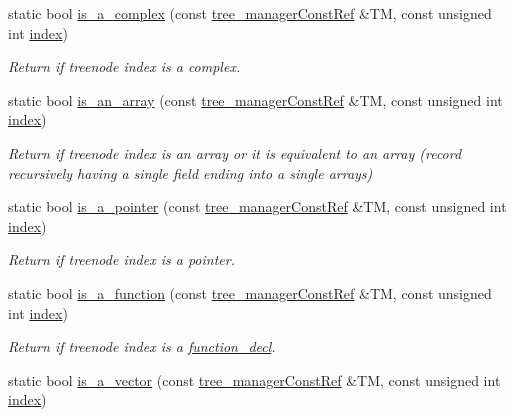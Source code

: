 \begin{DoxyCompactItemize}
static bool \hyperlink{classtree__helper_af7b886ed7c1bbaa4149b536830c5d16d}{is\+\_\+a\+\_\+complex} (const \hyperlink{tree__manager_8hpp_a792e3f1f892d7d997a8d8a4a12e39346}{tree\+\_\+manager\+Const\+Ref} \&TM, const unsigned int \hyperlink{tutorial__pact__2019_2Introduction_2third_2include_2Keccak_8h_a028c9bdc8344cca38ab522a337074797}{index})
\begin{DoxyCompactList}\small\item\em Return if treenode index is a complex. \end{DoxyCompactList}\item 
static bool \hyperlink{classtree__helper_a66c316e257537a7af62192751c0fb26a}{is\+\_\+an\+\_\+array} (const \hyperlink{tree__manager_8hpp_a792e3f1f892d7d997a8d8a4a12e39346}{tree\+\_\+manager\+Const\+Ref} \&TM, const unsigned int \hyperlink{tutorial__pact__2019_2Introduction_2third_2include_2Keccak_8h_a028c9bdc8344cca38ab522a337074797}{index})
\begin{DoxyCompactList}\small\item\em Return if treenode index is an array or it is equivalent to an array (record recursively having a single field ending into a single arrays) \end{DoxyCompactList}\item 
static bool \hyperlink{classtree__helper_a45e95e6b9cc351e7ecbd7837c0388e0a}{is\+\_\+a\+\_\+pointer} (const \hyperlink{tree__manager_8hpp_a792e3f1f892d7d997a8d8a4a12e39346}{tree\+\_\+manager\+Const\+Ref} \&TM, const unsigned int \hyperlink{tutorial__pact__2019_2Introduction_2third_2include_2Keccak_8h_a028c9bdc8344cca38ab522a337074797}{index})
\begin{DoxyCompactList}\small\item\em Return if treenode index is a pointer. \end{DoxyCompactList}\item 
static bool \hyperlink{classtree__helper_aa6612c96f6dd64598da3311387939635}{is\+\_\+a\+\_\+function} (const \hyperlink{tree__manager_8hpp_a792e3f1f892d7d997a8d8a4a12e39346}{tree\+\_\+manager\+Const\+Ref} \&TM, const unsigned int \hyperlink{tutorial__pact__2019_2Introduction_2third_2include_2Keccak_8h_a028c9bdc8344cca38ab522a337074797}{index})
\begin{DoxyCompactList}\small\item\em Return if treenode index is a \hyperlink{structfunction__decl}{function\+\_\+decl}. \end{DoxyCompactList}\item 
static bool \hyperlink{classtree__helper_ac4d19443208195cc70181f00f9f0d40e}{is\+\_\+a\+\_\+vector} (const \hyperlink{tree__manager_8hpp_a792e3f1f892d7d997a8d8a4a12e39346}{tree\+\_\+manager\+Const\+Ref} \&TM, const unsigned int \hyperlink{tutorial__pact__2019_2Introduction_2third_2include_2Keccak_8h_a028c9bdc8344cca38ab522a337074797}{index})

\end{DoxyCompactItemize}
